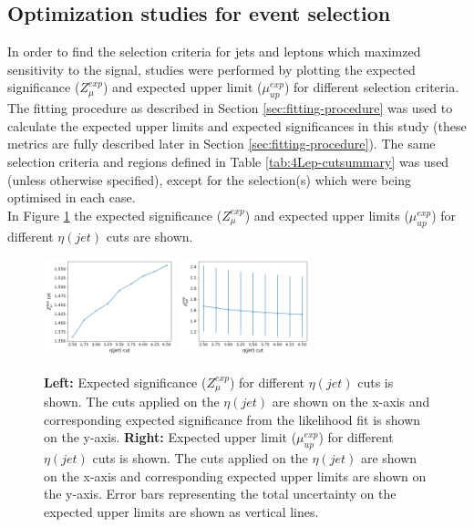 \subsection{Optimization studies for event selection}
\label{sec:optimization-studies-tetra}
In order to find the selection criteria for jets and leptons which maximzed sensitivity to the \tWZ signal, studies were performed by plotting the expected significance ($Z_{\mu}^{exp}$) and expected upper limit ($\mu_{up}^{exp}$) for different selection criteria. The fitting procedure as described in Section \ref{sec:fitting-procedure} was used to calculate the expected upper limits and expected significances in this study (these metrics are fully described later in Section \ref{sec:fitting-procedure}). The same selection criteria and regions defined in Table \ref{tab:4Lep-cutsummary} was used (unless otherwise specified), except for the selection(s) which were being optimised in each case.  \\

In Figure \ref{fig:4lep-jetEta-optimisation} the expected significance ($Z_{\mu}^{exp}$) and expected upper limits ($\mu_{up}^{exp}$) for different $\eta(jet)$ cuts are shown. 
\begin{figure}[h!]
	\includegraphics[width = 0.34\textwidth]{figures/signif_jetEta.png}
  	\includegraphics[width = 0.34\textwidth]{figures/exp_upper_jetEta.png}
  \centering
	\caption{\textbf{Left:} Expected significance ($Z_{\mu}^{exp}$) for different $\eta(jet)$ cuts is shown. The cuts applied on the $\eta(jet)$ are shown on the x-axis and corresponding expected significance from the likelihood fit is shown on the y-axis. \textbf{Right:} Expected upper limit ($\mu_{up}^{exp}$) for different $\eta(jet)$ cuts is shown. The cuts applied on the $\eta(jet)$ are shown on the x-axis and corresponding expected upper limits are shown on the y-axis. Error bars representing the total uncertainty on the expected upper limits are shown as vertical lines.}
	\label{fig:4lep-jetEta-optimisation}
\end{figure}


